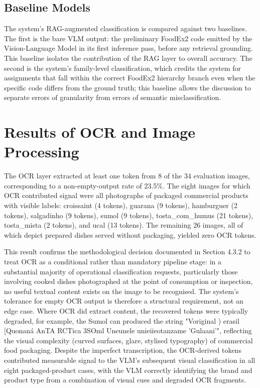 \hypertarget{baseline-models}{%
\subsection{Baseline Models}\label{baseline-models}}

The system's RAG-augmented classification is compared against two baselines. The first is the bare VLM output: the preliminary FoodEx2 code emitted by the Vision-Language Model in its first inference pass, before any retrieval grounding. This baseline isolates the contribution of the RAG layer to overall accuracy. The second is the system's family-level classification, which credits the system for assignments that fall within the correct FoodEx2 hierarchy branch even when the specific code differs from the ground truth; this baseline allows the discussion to separate errors of granularity from errors of semantic misclassification.

\hypertarget{results-of-ocr-and-image-processing}{%
\section{Results of OCR and Image Processing}\label{results-of-ocr-and-image-processing}}

The OCR layer extracted at least one token from 8 of the 34 evaluation images, corresponding to a non-empty-output rate of 23.5\%. The eight images for which OCR contributed signal were all photographs of packaged commercial products with visible labels: croissaint (4 tokens), guarana (9 tokens), hamburguer (2 tokens), salgadinho (9 tokens), sumol (9 tokens), tosta\_com\_humus (21 tokens), tosta\_mista (2 tokens), and ucal (13 tokens). The remaining 26 images, all of which depict prepared dishes served without packaging, yielded zero OCR tokens.

This result confirms the methodological decision documented in Section 4.3.2 to treat OCR as a conditional rather than mandatory pipeline stage: in a substantial majority of operational classification requests, particularly those involving cooked dishes photographed at the point of consumption or inspection, no useful textual content exists on the image to be recognised. The system's tolerance for empty OCR output is therefore a structural requirement, not an edge case. Where OCR did extract content, the recovered tokens were typically degraded, for example, the Sumol can produced the string "Voriginal ) erasil {[}Quonaná AnTA RCTica 3SOml Uneunele unieiieotanzame 'Gulaani'", reflecting the visual complexity (curved surfaces, glare, stylised typography) of commercial food packaging. Despite the imperfect transcription, the OCR-derived tokens contributed measurable signal to the VLM's subsequent visual classification in all eight packaged-product cases, with the VLM correctly identifying the brand and product type from a combination of visual cues and degraded OCR fragments.

